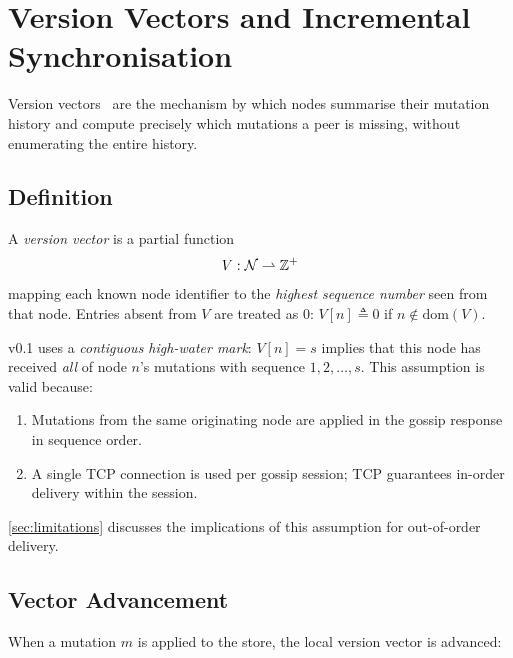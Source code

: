 \section{Version Vectors and Incremental Synchronisation}
\label{sec:vv}

Version vectors~\cite{fidge1988timestamps,mattern1989vector} are the mechanism
by which \pebble{} nodes summarise their mutation history and compute precisely
which mutations a peer is missing, without enumerating the entire history.

\subsection{Definition}

\begin{definition}
\label{def:vv}
A \emph{version vector} is a partial function
\[
  V : \mathcal{N} \rightharpoonup \mathbb{Z}^{+}
\]
mapping each known node identifier to the \emph{highest sequence number} seen
from that node. Entries absent from $V$ are treated as $0$:
$V[n] \triangleq 0$ if $n \notin \mathrm{dom}(V)$.
\end{definition}

\begin{remark}
\pebble{} v0.1 uses a \emph{contiguous high-water mark}: $V[n] = s$ implies
that this node has received \emph{all} of node $n$'s mutations with sequence
$1, 2, \ldots, s$. This assumption is valid because:
\begin{enumerate}[leftmargin=1.5em]
  \item Mutations from the same originating node are applied in the gossip
        response in sequence order.
  \item A single TCP connection is used per gossip session; TCP guarantees
        in-order delivery within the session.
\end{enumerate}
\cref{sec:limitations} discusses the implications of this assumption for
out-of-order delivery.
\end{remark}

\subsection{Vector Advancement}

When a mutation $m$ is applied to the store, the local version vector is advanced:

